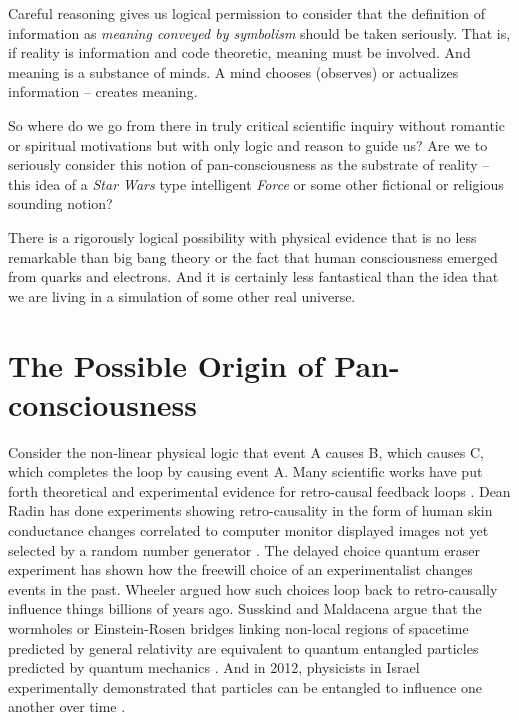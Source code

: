 \documentclass[submission,copyright,creativecommons]{eptcs}
\begin{document}
Careful reasoning gives us logical permission to consider that the definition of information as \textit{meaning conveyed by symbolism} should be taken seriously. That is, if reality is information and code theoretic, meaning must be involved. And meaning is a substance of minds. A mind chooses (observes) or actualizes information -- creates meaning.

So where do we go from there in truly critical scientific inquiry without romantic or spiritual motivations but with only logic and reason to guide us? Are we to seriously consider this notion of pan-consciousness as the substrate of reality -- this idea of a \textit{Star Wars} type intelligent \textit{Force} or some other fictional or religious sounding notion?

There is a rigorously logical possibility with physical evidence that is no less remarkable than big bang theory or the fact that human consciousness emerged from quarks and electrons. And it is certainly less fantastical than the idea that we are living in a simulation of some other real universe.

\section{The Possible Origin of Pan-consciousness}
\label{sec:6}

Consider the non-linear physical logic that event A causes B, which causes C, which completes the loop by causing event A. Many scientific works have put forth theoretical and experimental evidence for retro-causal feedback loops \cite{sarfatti2011retrocausality}. Dean Radin has done experiments showing retro-causality in the form of human skin conductance changes correlated to computer monitor displayed images not yet selected by a random number generator \cite{radin_electrodermal_2004}. The delayed choice quantum eraser experiment has shown how the freewill choice of an experimentalist changes events in the past. Wheeler argued how such choices loop back to retro-causally influence things billions of years ago. Susskind and Maldacena argue that the wormholes or Einstein-Rosen bridges linking non-local regions of spacetime predicted by general relativity are equivalent to quantum entangled particles predicted by quantum mechanics \cite{susskind2016addendum,maldacena2016black}. And in 2012, physicists in Israel experimentally demonstrated that particles can be entangled to influence one another over time \cite{brierley2015nonclassicality}.
\end{document}

